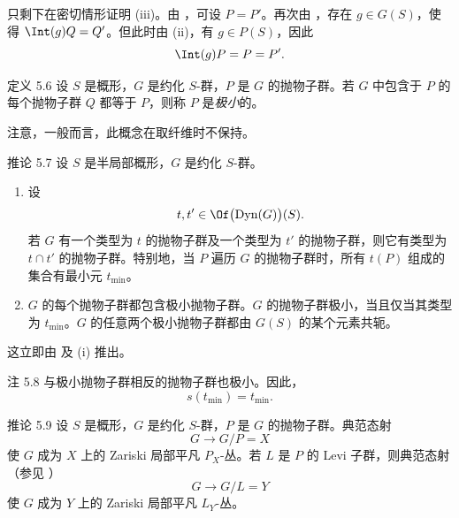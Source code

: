 只剩下在密切情形证明 \textup{(iii)}。由 ，可设 \(P=P'\)。再次由 ，存在 \(g\in G(S)\)，使得 \(\Int(g)Q=Q'\)。但此时由 \textup{(ii)}，有 \(g\in P(S)\)，因此
\[
 \Int(g)P=P=P'.
\]
\SGAQED


\begin{sgastatement}{定义 5.6}
设 \(S\) 是概形，\(G\) 是约化 \(S\)-群，\(P\) 是 \(G\) 的抛物子群。若 \(G\) 中包含于 \(P\) 的每个抛物子群 \(Q\) 都等于 \(P\)，则称 \(P\) 是\emph{极小}的。
\end{sgastatement}

注意，一般而言，此概念在取纤维时不保持。

\begin{sgastatement}{推论 5.7}
设 \(S\) 是半局部概形，\(G\) 是约化 \(S\)-群。
\begin{enumerate}[label=\textup{(\roman*)}]
\item 设
\[
 t,t'\in\Of\bigl(\operatorname{Dyn}(G)\bigr)(S).
\]
若 \(G\) 有一个类型为 \(t\) 的抛物子群及一个类型为 \(t'\) 的抛物子群，则它有类型为 \(t\cap t'\) 的抛物子群。特别地，当 \(P\) 遍历 \(G\) 的抛物子群时，所有 \(t(P)\) 组成的集合有最小元 \(t_{\min}\)。
\item \(G\) 的每个抛物子群都包含极小抛物子群。\(G\) 的抛物子群极小，当且仅当其类型为 \(t_{\min}\)。\(G\) 的任意两个极小抛物子群都由 \(G(S)\) 的某个元素共轭。
\end{enumerate}
\end{sgastatement}

这立即由  及 \textup{(i)} 推出。

\begin{sgastatement}{注 5.8}
与极小抛物子群相反的抛物子群也极小。因此，
\[
 s(t_{\min})=t_{\min}.
\]
\end{sgastatement}

\begin{sgastatement}{推论 5.9}
设 \(S\) 是概形，\(G\) 是约化 \(S\)-群，\(P\) 是 \(G\) 的抛物子群。典范态射
\[
 G\longrightarrow G/P=X
\]
使 \(G\) 成为 \(X\) 上的 Zariski 局部平凡 \(P_X\)-丛。若 \(L\) 是 \(P\) 的 Levi 子群，则典范态射 \textup{（参见 ）}
\[
 G\longrightarrow G/L=Y
\]
使 \(G\) 成为 \(Y\) 上的 Zariski 局部平凡 \(L_Y\)-丛。
\end{sgastatement}

